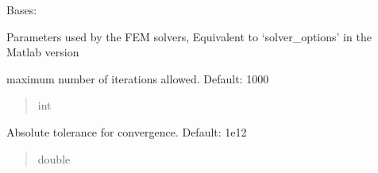 \documentclass[letterpaper,10pt,english]{sphinxmanual}
\begin{document}
\begin{fulllineitems}
\label{\detokenize{_autosummary/nirfasterff.utils.SolverOptions:nirfasterff.utils.SolverOptions}}
\pysigstartsignatures
\pysiglinewithargsret
{}
{\sphinxparamcomma {}\sphinxparamcomma {}\sphinxparamcomma {}\sphinxparamcomma {}}
{}
\pysigstopsignatures
\sphinxAtStartPar
Bases: 

\sphinxAtStartPar
Parameters used by the FEM solvers, Equivalent to ‘solver\_options’ in the Matlab version

\begin{fulllineitems}
\label{\detokenize{_autosummary/nirfasterff.utils.SolverOptions:nirfasterff.utils.SolverOptions.max_iter}}
\pysigstartsignatures
\pysigline
{}
\pysigstopsignatures
\sphinxAtStartPar
maximum number of iterations allowed. Default: 1000
\begin{quote}\begin{description}
\sphinxAtStartPar
int

\end{description}\end{quote}

\end{fulllineitems}


\begin{fulllineitems}
\label{\detokenize{_autosummary/nirfasterff.utils.SolverOptions:nirfasterff.utils.SolverOptions.AbsoluteTolerance}}
\pysigstartsignatures
\pysigline
{}
\pysigstopsignatures
\sphinxAtStartPar
Absolute tolerance for convergence. Default: 1e\sphinxhyphen{}12
\begin{quote}\begin{description}
\sphinxAtStartPar
double


\end{description}
\end{quote}
\end{fulllineitems}
\end{fulllineitems}
\end{document}
